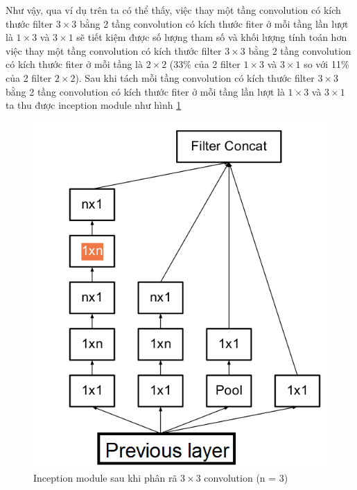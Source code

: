 \documentclass[a4paper,12pt]{report}
\begin{document}
\par Như vậy, qua ví dụ trên ta có thể thấy, việc thay một tầng convolution có kích thước filter $3 \times 3$ bằng 2 tầng convolution có kích thước fiter ở mỗi tầng lần lượt là $1 \times 3$ và $3 \times 1$ sẽ tiết kiệm được số lượng tham số và khối lượng tính toán hơn việc thay một tầng convolution có kích thước filter $3 \times 3$ bằng 2 tầng convolution có kích thước fiter ở mỗi tầng là $2 \times 2$ (33\% của 2 filter $1 \times 3$ và $3 \times 1$ so với 11\% của 2 filter $2 \times 2$). Sau khi tách mỗi tầng convolution có kích thước filter $3 \times 3$ bằng 2 tầng convolution có kích thước fiter ở mỗi tầng lần lượt là $1 \times 3$ và $3 \times 1$ ta thu được inception module như hình \ref{fig_fac_3x3}
\begin{figure}[H]
\centering 
\includegraphics[scale=0.5]{fac_3x3.png}
\caption{Inception module sau khi phân rã $3 \times 3$ convolution (n = 3)}
\label{fig_fac_3x3}
\end{figure}
\end{document}
